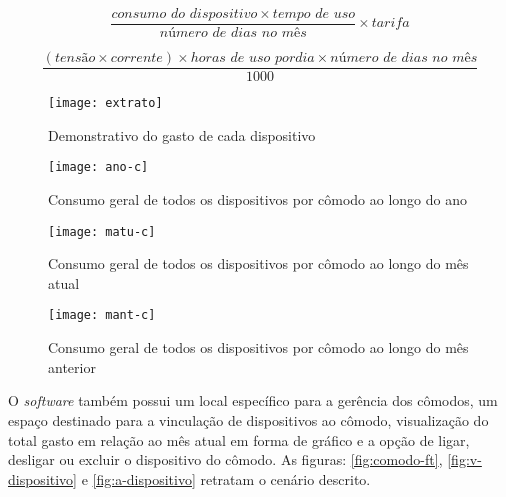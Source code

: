 \begin{equation} \label{eq-consumo}
	\frac{consumo \, \, do \, \, dispositivo \times tempo \, \, de \, \, uso}{número \, \, de \, \, dias \, \, no \, \, mês} \times tarifa
\end{equation}

\begin{equation} \label{eq-potencia}
	 \frac{ (tensão \times corrente) \times horas \, \, de \, \, uso \, \, por dia \times número \, \, de \, \, dias \, \, no \, \, mês}{1000}
\end{equation} 

\begin{figure}[h!]
	\texttt{[image: extrato]}
	\centering
	\caption[Demonstrativo do gasto de cada dispositivo]{Demonstrativo do gasto de cada dispositivo}
	\label{fig:extrato} 
\end{figure}
\FloatBarrier

\begin{figure}[h!]
	\texttt{[image: ano-c]}
	\centering
	\caption[Consumo geral de todos os dispositivos por cômodo ao longo do ano]{Consumo geral de todos os dispositivos por cômodo ao longo do ano}
	\label{fig:ano-c} 
\end{figure}
\FloatBarrier

\begin{figure}[h!]
	\texttt{[image: matu-c]}
	\centering
	\caption[Consumo geral de todos os dispositivos por cômodo ao longo do mês atual]{Consumo geral de todos os dispositivos por cômodo ao longo do mês atual}
	\label{fig:matu-c} 
\end{figure}
\FloatBarrier

\begin{figure}[h!]
	\texttt{[image: mant-c]}
	\centering
	\caption[Consumo geral de todos os dispositivos por cômodo ao longo do mês anterior]{Consumo geral de todos os dispositivos por cômodo ao longo do mês anterior}
	\label{fig:mant-c} 
\end{figure}
\FloatBarrier

O \textit{software} também possui um local específico para a gerência dos cômodos, um espaço destinado para a vinculação de dispositivos ao cômodo,
visualização do total gasto em relação ao mês atual em forma de gráfico e a opção de ligar, desligar ou excluir o dispositivo do cômodo. As figuras:
\ref{fig:comodo-ft}, \ref{fig:v-dispositivo} e \ref{fig:a-dispositivo} retratam o cenário descrito.

